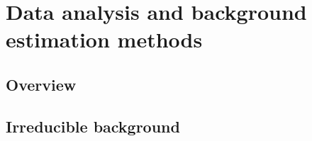 \chapter{Data analysis and background estimation methods}
\label{chap:DataAnalysis}

\section{Overview}

%

%

\section{Irreducible background}

%
